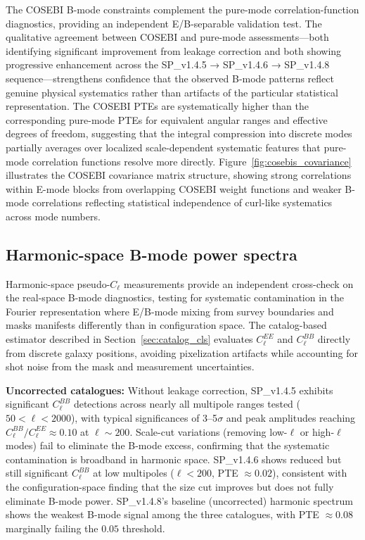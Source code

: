 \documentclass{aa}
\begin{document}
The COSEBI B-mode constraints complement the pure-mode correlation-function diagnostics, providing an independent E/B-separable validation test. The qualitative agreement between COSEBI and pure-mode assessments—both identifying significant improvement from leakage correction and both showing progressive enhancement across the SP\_v1.4.5 → SP\_v1.4.6 → SP\_v1.4.8 sequence—strengthens confidence that the observed B-mode patterns reflect genuine physical systematics rather than artifacts of the particular statistical representation. The COSEBI PTEs are systematically higher than the corresponding pure-mode PTEs for equivalent angular ranges and effective degrees of freedom, suggesting that the integral compression into discrete modes partially averages over localized scale-dependent systematic features that pure-mode correlation functions resolve more directly. Figure~\ref{fig:cosebis_covariance} illustrates the COSEBI covariance matrix structure, showing strong correlations within E-mode blocks from overlapping COSEBI weight functions and weaker B-mode correlations reflecting statistical independence of curl-like systematics across mode numbers.

\subsection{Harmonic-space B-mode power spectra}

Harmonic-space pseudo-$C_\ell$ measurements provide an independent cross-check on the real-space B-mode diagnostics, testing for systematic contamination in the Fourier representation where E/B-mode mixing from survey boundaries and masks manifests differently than in configuration space. The catalog-based estimator described in Section~\ref{sec:catalog_cls} evaluates $C_\ell^{EE}$ and $C_\ell^{BB}$ directly from discrete galaxy positions, avoiding pixelization artifacts while accounting for shot noise from the mask and measurement uncertainties.

\textbf{Uncorrected catalogues:} Without leakage correction, SP\_v1.4.5 exhibits significant $C_\ell^{BB}$ detections across nearly all multipole ranges tested ($50 < \ell < 2000$), with typical significances of \num{3}--\num{5}$\sigma$ and peak amplitudes reaching $C_\ell^{BB}/C_\ell^{EE} \approx 0.10$ at $\ell \sim 200$. Scale-cut variations (removing low-$\ell$ or high-$\ell$ modes) fail to eliminate the B-mode excess, confirming that the systematic contamination is broadband in harmonic space. SP\_v1.4.6 shows reduced but still significant $C_\ell^{BB}$ at low multipoles ($\ell < 200$, PTE $\approx 0.02$), consistent with the configuration-space finding that the size cut improves but does not fully eliminate B-mode power. SP\_v1.4.8's baseline (uncorrected) harmonic spectrum shows the weakest B-mode signal among the three catalogues, with PTE $\approx 0.08$ marginally failing the $0.05$ threshold.
\end{document}
